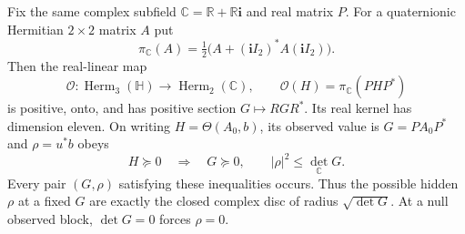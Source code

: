 \begin{proposition}
\label{q444:full-observation}
Fix the same complex subfield $\mathbb C=\mathbb R+\mathbb R\mathbf i$
and real matrix $P$. For a quaternionic Hermitian $2\times2$ matrix $A$
put
\[
 \pi_{\mathbb C}(A)=\tfrac12\bigl(A+(\mathbf iI_2)^*A(\mathbf iI_2)\bigr).
\]
Then the real-linear map
\[
 \mathscr O:\operatorname{Herm}_3(\mathbb H)\longrightarrow
       \operatorname{Herm}_2(\mathbb C),\qquad
 \mathscr O(H)=\pi_{\mathbb C}(PHP^*)
\]
is positive, onto, and has positive section $G\mapsto RGR^*$.
Its real kernel has dimension eleven. On writing $H=\Theta(A_0,b)$,
its observed value is $G=PA_0P^*$ and $\rho=u^*b$ obeys
\begin{equation}\label{q444:rho-bound}
 H\succeq0\quad\Longrightarrow\quad
 G\succeq0,\qquad |\rho|^2\leq\det_{\mathbb C}G.
\end{equation}
Every pair $(G,\rho)$ satisfying these inequalities occurs. Thus the
possible hidden $\rho$ at a fixed $G$ are exactly the closed complex disc
of radius $\sqrt{\det G}$. At a null observed block, $\det G=0$ forces
$\rho=0$.
\end{proposition}
